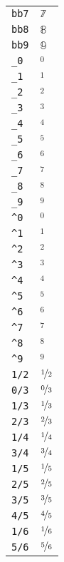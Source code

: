 \begin{longtable}{ll}
\texttt{bb7}&${}\mathbb{7}{}$\\
\texttt{bb8}&${}\mathbb{8}{}$\\
\texttt{bb9}&${}\mathbb{9}{}$\\
\texttt{\_0}&${}_0 {}$\\
\texttt{\_1}&${}_1 {}$\\
\texttt{\_2}&${}_2 {}$\\
\texttt{\_3}&${}_3 {}$\\
\texttt{\_4}&${}_4 {}$\\
\texttt{\_5}&${}_5 {}$\\
\texttt{\_6}&${}_6 {}$\\
\texttt{\_7}&${}_7 {}$\\
\texttt{\_8}&${}_8 {}$\\
\texttt{\_9}&${}_9 {}$\\
\texttt{\textasciicircum 0}&${}^0 {}$\\
\texttt{\textasciicircum 1}&${}^1 {}$\\
\texttt{\textasciicircum 2}&${}^2 {}$\\
\texttt{\textasciicircum 3}&${}^3 {}$\\
\texttt{\textasciicircum 4}&${}^4 {}$\\
\texttt{\textasciicircum 5}&${}^5 {}$\\
\texttt{\textasciicircum 6}&${}^6 {}$\\
\texttt{\textasciicircum 7}&${}^7 {}$\\
\texttt{\textasciicircum 8}&${}^8 {}$\\
\texttt{\textasciicircum 9}&${}^9 {}$\\
\texttt{1/2}&${}\nicefrac{1}{2} {}$\\
\texttt{0/3}&${}\nicefrac{0}{3} {}$\\
\texttt{1/3}&${}\nicefrac{1}{3} {}$\\
\texttt{2/3}&${}\nicefrac{2}{3} {}$\\
\texttt{1/4}&${}\nicefrac{1}{4} {}$\\
\texttt{3/4}&${}\nicefrac{3}{4} {}$\\
\texttt{1/5}&${}\nicefrac{1}{5} {}$\\
\texttt{2/5}&${}\nicefrac{2}{5} {}$\\
\texttt{3/5}&${}\nicefrac{3}{5} {}$\\
\texttt{4/5}&${}\nicefrac{4}{5} {}$\\
\texttt{1/6}&${}\nicefrac{1}{6} {}$\\
\texttt{5/6}&${}\nicefrac{5}{6} {}$\\

\end{longtable}
